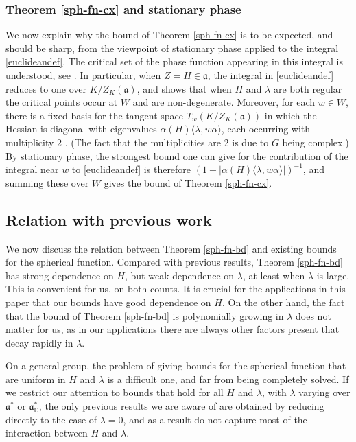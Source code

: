 \documentclass[12pt]{amsart}
\theoremstyle{remark}
\newcommand{\C}{\mathbb C}
\newcommand{\ga}{\mathfrak a}
\begin{document}
\subsubsection{Theorem \ref{sph-fn-cx} and stationary phase}

We now explain why the bound of Theorem \ref{sph-fn-cx} is to be expected, and should be sharp, from the viewpoint of stationary phase applied to the integral \eqref{euclideandef}. The critical set of the phase function appearing in this integral is understood, see \cite[\S 1]{Duistermaat_Kolk_Varadarajan_79}.  In particular, when $Z = H \in \ga$, the integral in \eqref{euclideandef} reduces to one over $K/Z_K(\ga)$, and \cite{Duistermaat_Kolk_Varadarajan_79} shows that when $H$ and $\lambda$ are both regular the critical points occur at $W$ and are non-degenerate.  Moreover, for each $w \in W$, there is a fixed basis for the tangent space $T_w(K/Z_K(\ga))$ in which the Hessian is diagonal with eigenvalues $\alpha(H) \langle \lambda, w\alpha \rangle$, each occurring with multiplicity 2 \cite[Prop. 1.4]{Duistermaat_Kolk_Varadarajan_79}. (The fact that the multiplicities are 2 is due to $G$ being complex.)  By stationary phase, the strongest bound one can give for the contribution of the integral near $w$ to \eqref{euclideandef} is therefore $(1 + |\alpha(H) \langle \lambda, w\alpha \rangle|)^{-1}$, and summing these over $W$ gives the bound of Theorem \ref{sph-fn-cx}.


\subsection{Relation with previous work}
\label{sec:sph-fn-prev}

We now discuss the relation between Theorem \ref{sph-fn-bd} and existing bounds for the spherical function.  Compared with previous results, Theorem \ref{sph-fn-bd} has strong dependence on $H$, but weak dependence on $\lambda$, at least when $\lambda$ is large.  This is convenient for us, on both counts.  It is crucial for the applications in this paper that our bounds have good dependence on $H$.  On the other hand, the fact that the bound of Theorem \ref{sph-fn-bd} is polynomially growing in $\lambda$ does not matter for us, as in our applications there are always other factors present that decay rapidly in $\lambda$.
\medskip

On a general group, the problem of giving bounds for the spherical function that are uniform in $H$ and $\lambda$ is a difficult one, and far from being completely solved.  If we restrict our attention to bounds that hold for all $H$ and $\lambda$, with $\lambda$ varying over $\ga^*$ or $\ga^*_\C$, the only previous results we are aware of are obtained by reducing directly to the case of $\lambda = 0$, and as a result do not capture most of the interaction between $H$ and $\lambda$.
\end{document}
